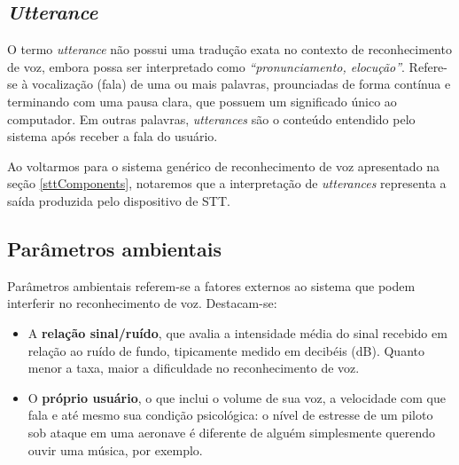 \subsection{\textit{Utterance}}

O termo \textit{utterance} não possui uma tradução exata no contexto de reconhecimento de voz, embora possa ser interpretado como \textit{``pronunciamento, elocução''}. Refere-se à vocalização (fala) de uma ou mais palavras, prounciadas de forma contínua e terminando com uma pausa clara, que possuem um significado único ao computador. Em outras palavras, \textit{utterances} são o conteúdo entendido pelo sistema após receber a fala do usuário.

Ao voltarmos para o sistema genérico de reconhecimento de voz apresentado na seção \ref{sttComponents}, notaremos que a interpretação de \textit{utterances} representa a saída produzida pelo dispositivo de STT.


\subsection{Parâmetros ambientais}

Parâmetros ambientais referem-se a fatores externos ao sistema que podem interferir no reconhecimento de voz. Destacam-se:

\begin{itemize}
\item A \textbf{relação sinal/ruído}, que avalia a intensidade média do sinal recebido em relação ao ruído de fundo, tipicamente medido em decibéis (dB). Quanto menor a taxa, maior a dificuldade no reconhecimento de voz.

\item O \textbf{próprio usuário}, o que inclui o volume de sua voz, a velocidade com que fala e até mesmo sua condição psicológica: o nível de estresse de um piloto sob ataque em uma aeronave é diferente de alguém simplesmente querendo ouvir uma música, por exemplo.
\end{itemize}

